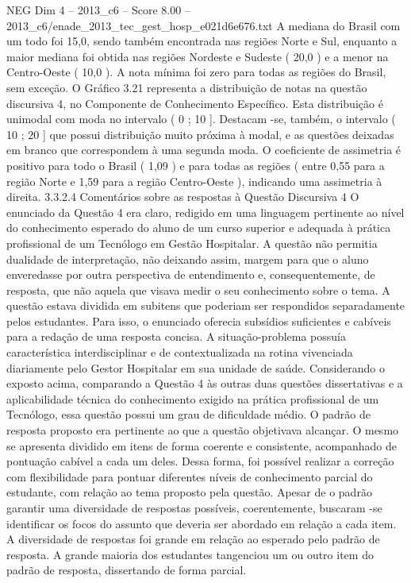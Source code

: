 \begin{textsample}{NEG Dim 4 – 2013\_c6 – Score 8.00 – 2013\_c6/enade\_2013\_tec\_gest\_hosp\_e021d6e676.txt}
A mediana do Brasil com um todo foi 15,0, sendo também encontrada nas regiões Norte e Sul, enquanto a maior mediana foi obtida nas regiões Nordeste e Sudeste ( 20,0 ) e a menor na Centro-Oeste ( 10,0 ).
A nota mínima foi zero para todas as regiões do Brasil, sem exceção.
O Gráfico 3.21 representa a distribuição de notas na questão discursiva 4, no Componente de Conhecimento Específico.
Esta distribuição é unimodal com moda no intervalo ( 0 ; 10 ].
Destacam -se, também, o intervalo ( 10 ; 20 ] que possui distribuição muito próxima à modal, e as questões deixadas em branco que correspondem à uma segunda moda.
O coeficiente de assimetria é positivo para todo o Brasil ( 1,09 ) e para todas as regiões ( entre 0,55 para a região Norte e 1,59 para a região Centro-Oeste ), indicando uma assimetria à direita. 3.3.2.4 Comentários sobre as respostas à Questão Discursiva 4 O enunciado da Questão 4 era claro, redigido em uma linguagem pertinente ao nível do conhecimento esperado do aluno de um curso superior e adequada à prática profissional de um Tecnólogo em Gestão Hospitalar.
A questão não permitia dualidade de interpretação, não deixando assim, margem para que o aluno enveredasse por outra perspectiva de entendimento e, consequentemente, de resposta, que não aquela que visava medir o seu conhecimento sobre o tema.
A questão estava dividida em subitens que poderiam ser respondidos separadamente pelos estudantes.
Para isso, o enunciado oferecia subsídios suficientes e cabíveis para a redação de uma resposta concisa.
A situação-problema possuía característica interdisciplinar e de contextualizada na rotina vivenciada diariamente pelo Gestor Hospitalar em sua unidade de saúde.
Considerando o exposto acima, comparando a Questão 4 às outras duas questões dissertativas e a aplicabilidade técnica do conhecimento exigido na prática profissional de um Tecnólogo, essa questão possui um grau de dificuldade médio.
O padrão de resposta proposto era pertinente ao que a questão objetivava alcançar.
O mesmo se apresenta dividido em itens de forma coerente e consistente, acompanhado de pontuação cabível a cada um deles.
Dessa forma, foi possível realizar a correção com flexibilidade para pontuar diferentes níveis de conhecimento parcial do estudante, com relação ao tema proposto pela questão.
Apesar de o padrão garantir uma diversidade de respostas possíveis, coerentemente, buscaram -se identificar os focos do assunto que deveria ser abordado em relação a cada item.
A diversidade de respostas foi grande em relação ao esperado pelo padrão de resposta.
A grande maioria dos estudantes tangenciou um ou outro item do padrão de resposta, dissertando de forma parcial.

\end{textsample}
